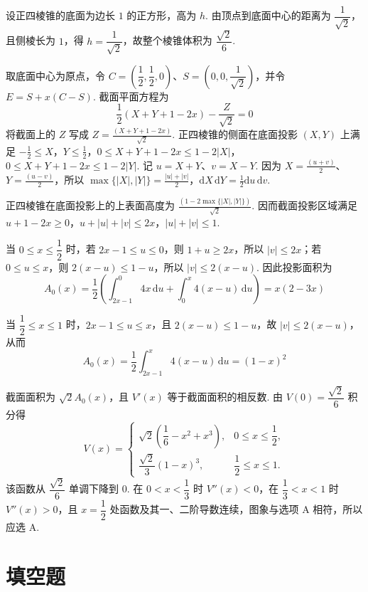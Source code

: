 \begin{solution}
设正四棱锥的底面为边长 \(1\) 的正方形，高为 \(h\). 由顶点到底面中心的距离为 \(\dfrac{1}{\sqrt2}\)，且侧棱长为 \(1\)，得 \(h=\dfrac1{\sqrt2}\)，故整个棱锥体积为 \(\dfrac{\sqrt2}{6}\).

取底面中心为原点，令 \(C=\left(\dfrac12,\dfrac12,0\right)\)、\(S=\left(0,0,\dfrac1{\sqrt2}\right)\)，并令 \(E=S+x(C-S)\). 截面平面方程为
\[
\frac12(X+Y+1-2x)-\frac{Z}{\sqrt2}=0
\]
将截面上的 \(Z\) 写成 \(Z=\frac{(X+Y+1-2x)}{\sqrt2}\). 正四棱锥的侧面在底面投影 \((X,Y)\) 上满足
\(-\frac12\leqslant X\)，\(Y\leqslant\frac12\)，\(0\leqslant X+Y+1-2x\leqslant1-2|X|\)，\(0\leqslant X+Y+1-2x\leqslant1-2|Y|\).
记 \(u=X+Y\)、\(v=X-Y\). 因为 \(X=\frac{(u+v)}{2}\)、\(Y=\frac{(u-v)}{2}\)，所以
\(\max\{|X|,|Y|\}=\frac{|u|+|v|}{2}\)，\(\mathrm dX\,\mathrm dY=\frac12\mathrm du\,\mathrm dv\).

正四棱锥在底面投影上的上表面高度为 \(\frac{(1-2\max\{|X|,|Y|\})}{\sqrt2}\). 因而截面投影区域满足
\(u+1-2x\geqslant0\)，\(u+|u|+|v|\leqslant2x\)，\(|u|+|v|\leqslant1\).

当 \(0\leqslant x\leqslant\dfrac12\) 时，若 \(2x-1\leqslant u\leqslant0\)，则 \(1+u\geqslant2x\)，所以 \(|v|\leqslant2x\)；若 \(0\leqslant u\leqslant x\)，则 \(2(x-u)\leqslant1-u\)，所以 \(|v|\leqslant2(x-u)\). 因此投影面积为
\[
A_0(x)=\frac12\left(\int_{2x-1}^{0}4x\,\mathrm du+\int_{0}^{x}4(x-u)\,\mathrm du\right)=x(2-3x)
\]

当 \(\dfrac12\leqslant x\leqslant1\) 时，\(2x-1\leqslant u\leqslant x\)，且 \(2(x-u)\leqslant1-u\)，故 \(|v|\leqslant2(x-u)\)，从而
\[
A_0(x)=\frac12\int_{2x-1}^{x}4(x-u)\,\mathrm du=(1-x)^2
\]

截面面积为 \(\sqrt2 A_0(x)\)，且 \(V'(x)\) 等于截面面积的相反数. 由 \(V(0)=\dfrac{\sqrt2}{6}\) 积分得
\[
V(x)=\begin{cases}
\sqrt2\left(\dfrac16-x^2+x^3\right),&0\leqslant x\leqslant\dfrac12,\\
\dfrac{\sqrt2}{3}(1-x)^3,&\dfrac12\leqslant x\leqslant1.
\end{cases}
\]
该函数从 \(\dfrac{\sqrt2}{6}\) 单调下降到 \(0\). 在 \(0<x<\dfrac13\) 时 \(V''(x)<0\)，在 \(\dfrac13<x<1\) 时 \(V''(x)>0\)，且 \(x=\dfrac12\) 处函数及其一、二阶导数连续，图象与选项 A 相符，所以应选 A.
\end{solution}

\section{填空题}

